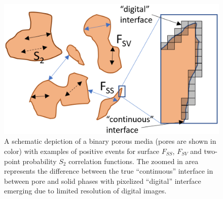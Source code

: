 \documentclass[reprint,amsmath,amssymb,aps,pre,showkeys,showpacs]{revtex4-1}
\begin{document}
\begin{figure}[ht]
  \centering
  \includegraphics[width=\linewidth]{images/scheme.png}
  \caption[]{A schematic depiction of a binary porous media (pores are shown in
    color) with examples of positive events for surface $F_{SS}$, $F_{SV}$ and
    two-point probability $S_2$ correlation functions. The zoomed in area
    represents the difference between the true ``continuous'' interface in
    between pore and solid phases with pixelized ``digital'' interface emerging
    due to limited resolution of digital images.}
  \label{fig:scheme}
\end{figure}
\end{document}
